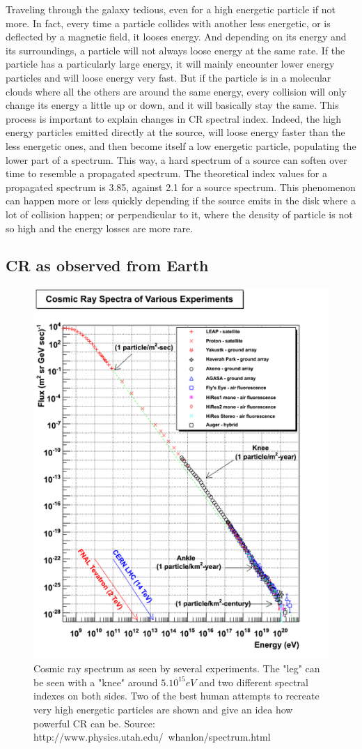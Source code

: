 Traveling through the galaxy tedious, even for a high energetic particle if not more. In fact, every time a particle collides with another less energetic, or is deflected by a magnetic field, it looses energy. And depending on its energy and its surroundings, a particle will not always loose energy at the same rate.
If the particle has a particularly large energy, it will mainly encounter lower energy particles and will loose energy very fast. But if the particle is in a molecular clouds where all the others are around the same energy, every collision will only change its energy a little up or down, and it will basically stay the same.
This process is important to explain changes in CR spectral index. Indeed, the high energy particles emitted directly at the source, will loose energy faster than the less energetic ones, and then become itself a low energetic particle, populating the lower part of a spectrum. This way, a hard spectrum of a source can soften over time to resemble a propagated spectrum. The theoretical index values for a propagated spectrum is 3.85, against 2.1 for a source spectrum. 
This phenomenon can happen more or less quickly depending if the source emits in the disk where a lot of collision happen; or perpendicular to it, where the density of particle is not so high and the energy losses are more rare.



\subsection{CR as observed from Earth}

\begin{figure}[h]
 \centering
 \includegraphics[width=.5\linewidth]{pic/theory/CR_spectrum.png}
 \caption{Cosmic ray spectrum as seen by several experiments. The "leg" can be seen with a "knee" around $5.10^{15} eV$ and two different spectral indexes on both sides. Two of the best human attempts to recreate very high energetic particles are shown and give an idea how powerful CR can be.
 Source: http://www.physics.utah.edu/~whanlon/spectrum.html}
 \label{fig:CR_spectrum}
\end{figure}


